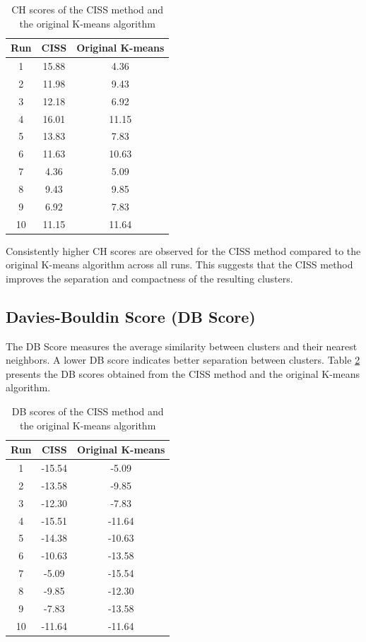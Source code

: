 \documentclass[10pt,twocolumn,a4paper]{article}
\begin{document}
\begin{table}[ht]
  \centering
  \caption{CH scores of the CISS method and the original K-means algorithm}
  \label{table:chscore}
  \begin{tabular}{ccc}
    \hline
    Run & CISS & Original K-means \\
    \hline
    1   & 15.88 & 4.36 \\
    2   & 11.98 & 9.43 \\
    3   & 12.18 & 6.92 \\
    4   & 16.01 & 11.15 \\
    5   & 13.83 & 7.83 \\
    6   & 11.63 & 10.63 \\
    7   & 4.36  & 5.09 \\
    8   & 9.43  & 9.85 \\
    9   & 6.92  & 7.83 \\
    10  & 11.15 & 11.64 \\
    \hline
  \end{tabular}
\end{table}

Consistently higher CH scores are observed for the CISS method compared to the original K-means algorithm across all runs. This suggests that the CISS method improves the separation and compactness of the resulting clusters.

\subsection{Davies-Bouldin Score (DB Score)}

The DB Score measures the average similarity between clusters and their nearest neighbors. A lower DB score indicates better separation between clusters. Table \ref{table:dbscore} presents the DB scores obtained from the CISS method and the original K-means algorithm.

\begin{table}[ht]
  \centering
  \caption{DB scores of the CISS method and the original K-means algorithm}
  \label{table:dbscore}
  \begin{tabular}{ccc}
    \hline
    Run & CISS & Original K-means \\
    \hline
    1   & -15.54 & -5.09 \\
    2   & -13.58 & -9.85 \\
    3   & -12.30 & -7.83 \\
    4   & -15.51 & -11.64 \\
    5   & -14.38 & -10.63 \\
    6   & -10.63 & -13.58 \\
    7   & -5.09  & -15.54 \\
    8   & -9.85  & -12.30 \\
    9   & -7.83  & -13.58 \\
    10  & -11.64 & -11.64 \\
    \hline
  \end{tabular}
\end{table}
\end{document}
